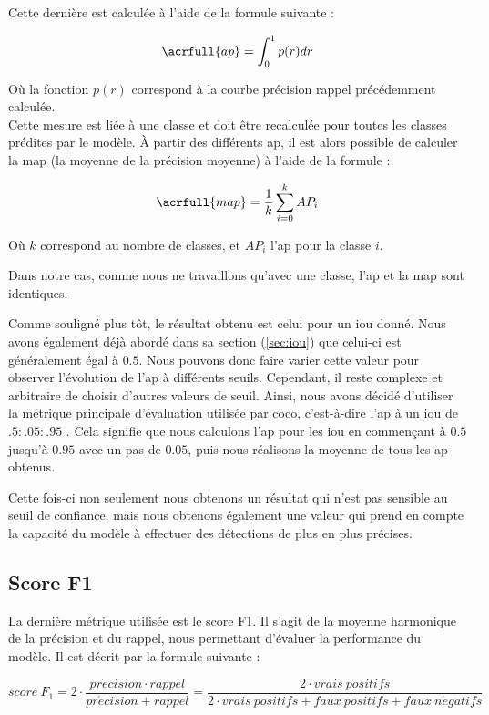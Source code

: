Cette dernière est calculée à l'aide de la formule suivante :

\[\acrfull{ap} = \int_{0}^{1} p(r)dr\]

Où la fonction $p(r)$ correspond à la courbe précision rappel précédemment calculée.\\

Cette mesure est liée à une classe et doit être recalculée pour toutes les classes prédites par le modèle. À partir des différents \acrshort{ap}, il est alors possible de calculer la \acrfull{map} (la moyenne de la précision moyenne) à l'aide de la formule :

\[\acrfull{map}=\frac{1}{k}\sum_{i=0}^{k}AP_i\]

Où $k$ correspond au nombre de classes, et $AP_i$ l'\acrshort{ap} pour la classe $i$.

Dans notre cas, comme nous ne travaillons qu'avec une classe, l'\acrshort{ap} et la \acrshort{map} sont identiques.

Comme souligné plus tôt, le résultat obtenu est celui pour un \acrshort{iou} donné. Nous avons également déjà abordé dans sa section (\ref{sec:iou}) que celui-ci est généralement égal à $0.5$. Nous pouvons donc faire varier cette valeur pour observer l'évolution de l'\acrshort{ap} à différents seuils. Cependant, il reste complexe et arbitraire de choisir d'autres valeurs de seuil. Ainsi, nous avons décidé d'utiliser la métrique principale d'évaluation utilisée par \acrshort{coco}, c'est-à-dire l'\acrshort{ap} à un \acrshort{iou} de $.5:.05:.95$ \cite{noauthor_coco_nodate}. Cela signifie que nous calculons l'\acrshort{ap} pour les \acrshort{iou} en commençant à $0.5$ jusqu'à $0.95$ avec un pas de $0.05$, puis nous réalisons la moyenne de tous les \acrshort{ap} obtenus.

Cette fois-ci non seulement nous obtenons un résultat qui n'est pas sensible au seuil de confiance, mais nous obtenons également une valeur qui prend en compte la capacité du modèle à effectuer des détections de plus en plus précises.

\subsection{Score F1}

La dernière métrique utilisée est le score F1. Il s'agit de la moyenne harmonique de la précision et du rappel, nous permettant d'évaluer la performance du modèle. Il est décrit par la formule suivante :

\[score \: F_1 = 2 \cdot \frac{pr\acute{e}cision \cdot rappel}{pr\acute{e}cision + rappel} = \frac{2 \cdot vrais \: positifs}{2 \cdot vrais \: positifs + faux \: positifs + faux \: n\acute{e}gatifs}\]

